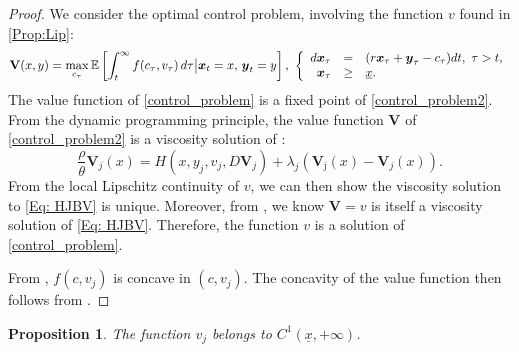 \documentclass[11pt]{article}
\numberwithin{equation}{section}
\newtheorem{prop}[thm]{Proposition}
\theoremstyle{definition}
\newcommand{\EE}{\mathbb{E}}
\newcommand{\ux}{{\underline x}}
\newcommand{\beq}{\begin{equation}}
\newcommand{\eeq}{\end{equation}}
\theoremstyle{plain}
\begin{document}
\begin{proof}
We consider the optimal control problem, involving the function $v$ found in \cref{Prop:Lip}: 
\begin{equation}\label{control_problem2}
	\mathbf{V}(x,y)=\max_{c_\tau}\EE \left[\int_t^{\infty} f(c_\tau,v_\tau)\, d\tau \big\vert \boldsymbol{x}_t=x,\,\boldsymbol{y}_t=y\right],\, \,
      \left\{
        \begin{array}[c]{rcl}
          d\boldsymbol{x}_\tau &=& (r \boldsymbol{x}_\tau+\boldsymbol{y}_{\tau} - c_\tau)dt,\,\,\tau>t,\\
          \boldsymbol{x}_\tau  &\geq& \underline{x}.    
        \end{array}
      \right.  
	\end{equation}
The value function of \eqref{control_problem} is a fixed point of \eqref{control_problem2}. From the dynamic programming principle, the value function $\mathbf{V}$ of \eqref{control_problem2} is a viscosity solution of :
\beq\label{Eq: HJBV}
	\frac{\rho}{\theta} \mathbf{V}_j(x)
	=H(x,y_j,v_j,D\mathbf{V}_j)+\lambda_j(\mathbf{V}_{\bar \jmath}(x)-\mathbf{V}_j(x)).
\eeq
From the local Lipschitz continuity of $v$, we can then show the viscosity solution to \eqref{Eq: HJBV} is unique. Moreover, from , we know $\mathbf{V}=v$ is itself a viscosity solution of \eqref{Eq: HJBV}. Therefore, the function $v$ is a solution of \eqref{control_problem}.\par 
From , $f(c,v_j)$ is concave in $(c,v_j)$. The concavity of the value function then follows from \cite{duffie1992stochastic}.
\end{proof}
\begin{prop}\label{Prop: v C1}
The function $v_j$ belongs to $C^1(\ux,+\infty)$. 
\end{prop}
\end{document}
